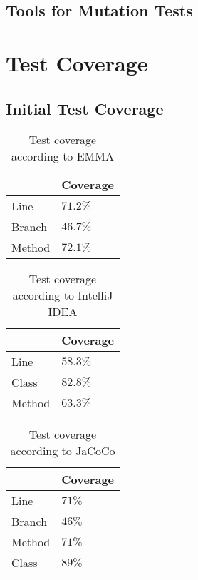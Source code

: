 \documentclass[]{article}
\begin{document}
\subsection{Tools for Mutation Tests}

\section{Test Coverage}

\subsection{Initial Test Coverage}

\begin{table}[]
	\begin{center}
	\begin{tabular}{|l||l|}
		\hline
		&  Coverage \\ \hline\hline
		Line	& $71.2\%$   \\
		Branch	& $46.7\%$  \\
		Method	& $72.1\%$  \\ \hline
	\end{tabular}
	\caption{Test coverage according to EMMA}
	\end{center}
	
\end{table}

\begin{table}[]
	\begin{center}
		\begin{tabular}{|l||l|}
			\hline
			&  Coverage \\ \hline\hline
			Line	& $58.3\%$   \\
			Class	& $82.8\%$  \\
			Method	& $63.3\%$  \\ \hline
		\end{tabular}
		\caption{Test coverage according to IntelliJ IDEA}
	\end{center}
\end{table}


\begin{table}[]
	\begin{center}
		\begin{tabular}{|l||l|}
			\hline
			&  Coverage \\ \hline\hline
			Line	& $71\%$   \\
			Branch  & $46\%$ \\
			Method	& $71\%$  \\ 
			Class	& $89\%$  \\
			\hline
		\end{tabular}
		\caption{Test coverage according to JaCoCo}
	\end{center}
\end{table}
\end{document}
